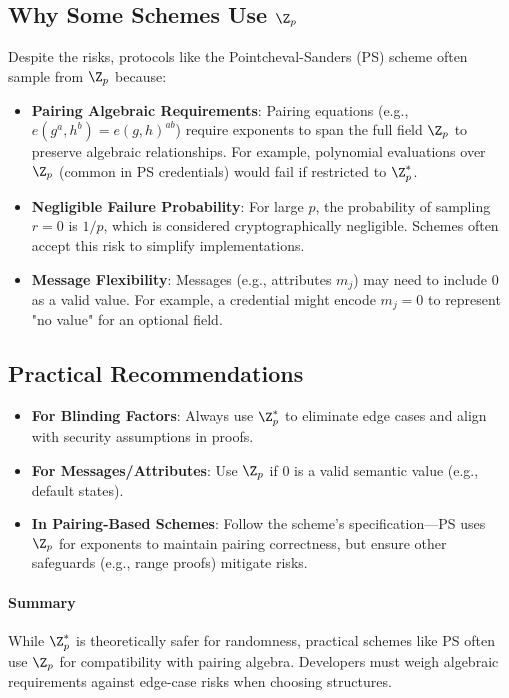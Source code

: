 \subsection{Why Some Schemes Use $\Z_p$}
Despite the risks, protocols like the Pointcheval-Sanders (PS) scheme often sample from $\Z_p$ because:
\begin{itemize}
    \item \textbf{Pairing Algebraic Requirements}: 
        Pairing equations (e.g., $e(g^a, h^b) = e(g, h)^{ab}$) require exponents to span the full field $\Z_p$ to preserve algebraic relationships. For example, polynomial evaluations over $\Z_p$ (common in PS credentials) would fail if restricted to $\Z_p^*$.
    
    \item \textbf{Negligible Failure Probability}: 
        For large $p$, the probability of sampling $r = 0$ is $1/p$, which is considered cryptographically negligible. Schemes often accept this risk to simplify implementations.
    
    \item \textbf{Message Flexibility}: 
        Messages (e.g., attributes $m_j$) may need to include 0 as a valid value. For example, a credential might encode $m_j = 0$ to represent "no value" for an optional field.
\end{itemize}

\subsection{Practical Recommendations}
\begin{itemize}
    \item \textbf{For Blinding Factors}: Always use $\Z_p^*$ to eliminate edge cases and align with security assumptions in proofs.
    \item \textbf{For Messages/Attributes}: Use $\Z_p$ if 0 is a valid semantic value (e.g., default states).
    \item \textbf{In Pairing-Based Schemes}: Follow the scheme's specification—PS uses $\Z_p$ for exponents to maintain pairing correctness, but ensure other safeguards (e.g., range proofs) mitigate risks.
\end{itemize}

\paragraph{Summary} While $\Z_p^*$ is theoretically safer for randomness, practical schemes like PS often use $\Z_p$ for compatibility with pairing algebra. Developers must weigh algebraic requirements against edge-case risks when choosing structures.